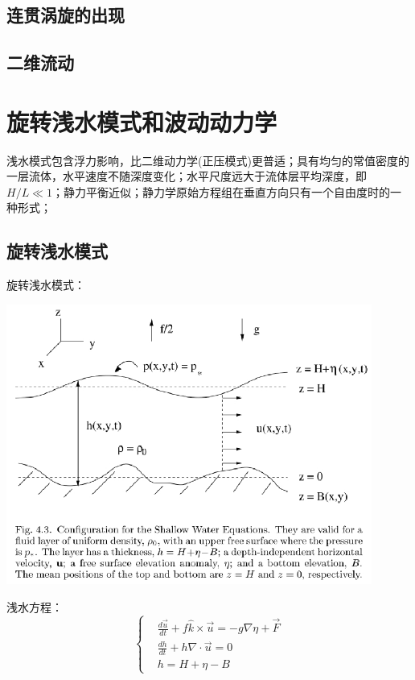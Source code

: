\documentclass{article}
\begin{document}
\subsection{连贯涡旋的出现}
\subsection{二维流动}

\section{旋转浅水模式和波动动力学}
浅水模式包含浮力影响，比二维动力学(正压模式)更普适；具有均匀的常值密度的一层流体，水平速度不随深度变化；水平尺度远大于流体层平均深度，即$H/L \ll 1$；静力平衡近似；静力学原始方程组在垂直方向只有一个自由度时的一种形式；

\subsection{旋转浅水模式}
旋转浅水模式：
\begin{center}
    \includegraphics[width=12cm]{Fig3_1.png}
\end{center}

浅水方程：
$$\begin{cases}
    &\frac{d\vec{u}}{dt} + f\hat{k}\times\vec{u} = -g\nabla\eta + \vec{F}\\
    &\frac{dh}{dt} + h\nabla\cdot\vec{u} = 0\\
    &h=H+\eta-B
\end{cases}$$
\end{document}
